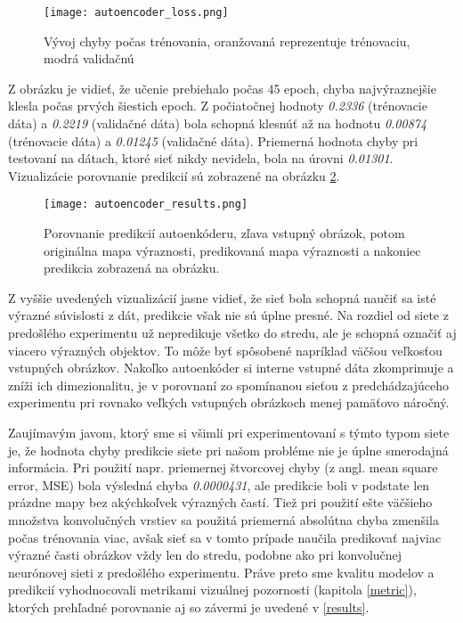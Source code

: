 \begin{figure}[H]
	\begin{center}\texttt{[image: autoencoder\_loss.png]}
		\caption[Vývoj chyby počas trénovania autoenkóderu]{
			Vývoj chyby počas trénovania, oranžovaná reprezentuje trénovaciu, modrá validačnú 
		}\label{autoencoder_loss}
	\end{center}
\end{figure}

Z obrázku je vidieť, že učenie prebiehalo počas 45 epoch, chyba najvýraznejšie klesla počas prvých šiestich epoch. Z počiatočnej hodnoty \textit{0.2336} (trénovacie dáta) a \textit{0.2219} (validačné dáta) bola schopná klesnúť až na hodnotu \textit{0.00874} (trénovacie dáta) a \textit{0.01245} (validačné dáta). Priemerná hodnota chyby pri testovaní na dátach, ktoré sieť nikdy nevidela, bola na úrovni \textit{0.01301}. Vizualizácie porovnanie predikcií sú zobrazené na obrázku \ref{autoencoder_results}.
\newpage
\begin{figure}[H]
	\begin{center}\texttt{[image: autoencoder\_results.png]}
		\caption[Porovnanie predikcií autoenkóderu voči reálnym mapám výraznosti]{
			Porovnanie predikcií autoenkóderu, zľava vstupný obrázok, potom originálna mapa výraznosti, predikovaná mapa výraznosti a nakoniec predikcia zobrazená na obrázku. 
		}\label{autoencoder_results}
	\end{center}
\end{figure}

Z vyššie uvedených vizualizácií jasne vidieť, že sieť bola schopná naučiť sa isté výrazné súvislosti z dát, predikcie však nie sú úplne presné. Na rozdiel od siete z predošlého experimentu už nepredikuje všetko do stredu, ale je schopná označiť aj viacero výrazných objektov. To môže byť spôsobené napríklad väčšou veľkosťou vstupných obrázkov. Nakoľko autoenkóder si interne vstupné dáta zkomprimuje a zníži ich dimezionalitu, je v porovnaní zo spomínanou sieťou z predchádzajúceho experimentu pri rovnako veľkých vstupných obrázkoch menej pamäťovo náročný.

Zaujímavým javom, ktorý sme si všimli pri experimentovaní s týmto typom siete je, že hodnota chyby predikcie siete pri našom probléme nie je úplne smerodajná informácia. Pri použití napr. priemernej štvorcovej chyby (z angl. mean square error, MSE) bola výsledná chyba \textit{0.0000431}, ale predikcie boli v podstate len prázdne mapy bez akýchkoľvek výrazných častí. Tiež pri použití ešte väčšieho množstva konvolučných vrstiev sa použitá priemerná absolútna chyba zmenšila počas trénovania viac, avšak sieť sa v tomto prípade naučila predikovať najviac výrazné časti obrázkov vždy len do stredu, podobne ako pri konvolučnej neurónovej sieti z predošlého experimentu. Práve preto sme kvalitu modelov a predikcií vyhodnocovali metrikami vizuálnej pozornosti (kapitola \ref{metric}), ktorých prehľadné porovnanie aj so závermi je uvedené v \ref{results}.

